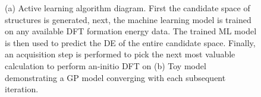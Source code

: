 \begin{figure}
\centering
{}
\caption{\label{fig:all_diagram}
(a) Active learning algorithm diagram.
First the candidate space of structures is generated,
next, the machine learning model is trained on any available DFT formation energy data.
The trained ML model is then used to predict the DE of the entire candidate space.
Finally, an acquisition step is performed to pick the next most valuable calculation to perform an-initio DFT on
(b) Toy model demonstrating a GP model converging with each subsequent iteration.
}
\end{figure}




